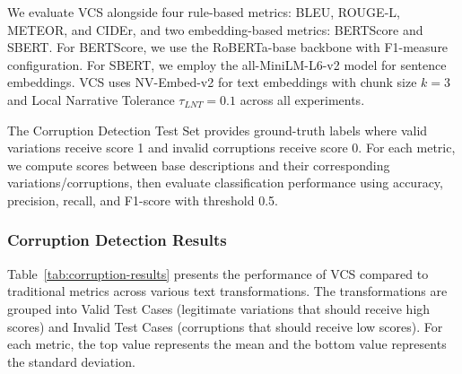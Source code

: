 \documentclass[main.tex]{subfiles}
\begin{document}
We evaluate VCS alongside four rule-based metrics: BLEU, ROUGE-L, METEOR, and CIDEr, and two embedding-based metrics: BERTScore and SBERT. For BERTScore, we use the RoBERTa-base backbone with F1-measure configuration. For SBERT, we employ the all-MiniLM-L6-v2 model for sentence embeddings. VCS uses NV-Embed-v2 for text embeddings with chunk size $k=3$ and Local Narrative Tolerance $\tau_{LNT}=0.1$ across all experiments.

The Corruption Detection Test Set provides ground-truth labels where valid variations receive score 1 and invalid corruptions receive score 0. For each metric, we compute scores between base descriptions and their corresponding variations/corruptions, then evaluate classification performance using accuracy, precision, recall, and F1-score with threshold 0.5.

\subsubsection{Corruption Detection Results}

Table~\ref{tab:corruption-results} presents the performance of VCS compared to traditional metrics across various text transformations. The transformations are grouped into Valid Test Cases (legitimate variations that should receive high scores) and Invalid Test Cases (corruptions that should receive low scores). For each metric, the top value represents the mean and the bottom value represents the standard deviation.
\end{document}
